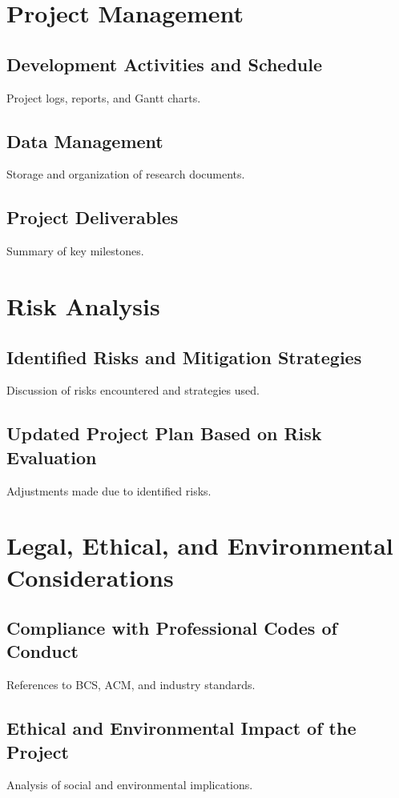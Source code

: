 \documentclass[a4paper,12pt]{report}
\begin{document}
\section{Project Management}
\subsection{Development Activities and Schedule}
Project logs, reports, and Gantt charts.

\subsection{Data Management}
Storage and organization of research documents.

\subsection{Project Deliverables}
Summary of key milestones.

\section{Risk Analysis}
\subsection{Identified Risks and Mitigation Strategies}
Discussion of risks encountered and strategies used.

\subsection{Updated Project Plan Based on Risk Evaluation}
Adjustments made due to identified risks.

\section{Legal, Ethical, and Environmental Considerations}
\subsection{Compliance with Professional Codes of Conduct}
References to BCS, ACM, and industry standards.

\subsection{Ethical and Environmental Impact of the Project}
Analysis of social and environmental implications.
\end{document}
